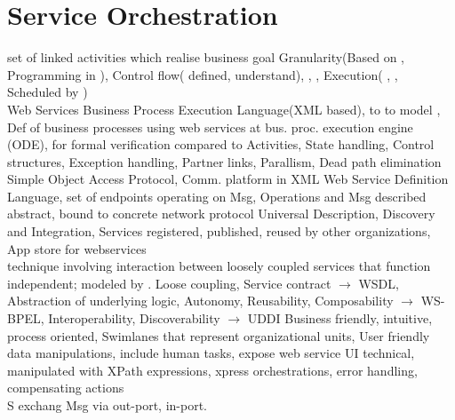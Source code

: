 \section{Service Orchestration}
set of linked activities which realise business goal
  
Granularity(Based on  , 
Programming in  ),
Control flow(  defined, 
  understand),
,
,
Execution(
,
, Scheduled by  )
%
\\
Web Services Business Process Execution Language(XML based),
to 
to model ,
Def of business processes using web services at bus. proc. execution engine (ODE),
 for formal verification compared to 
Activities,
State handling,
Control structures,
Exception handling,
Partner links,
Parallism,
Dead path elimination
Simple Object Access Protocol,
Comm. platform in XML
Web Service Definition Language,
set of endpoints operating on Msg,
Operations and Msg described abstract, 
bound to concrete network protocol
Universal Description, Discovery and Integration,
Services registered, published, reused by other organizations,
App store for webservices
\\
technique involving interaction between loosely coupled services 
that function independent;
modeled by .
Loose coupling,
Service contract
$\rightarrow$
WSDL,
Abstraction of underlying logic,
Autonomy,
Reusability,
Composability $\rightarrow$ WS-BPEL,
Interoperability,
Discoverability $\rightarrow$ UDDI
Business friendly,
intuitive,
process oriented,
Swimlanes that represent organizational units,
User friendly data manipulations,
include human tasks,
expose web service UI
technical,
manipulated with XPath expressions,
xpress orchestrations,
error handling,
compensating actions
\\
S exchang Msg via out-port, in-port.
